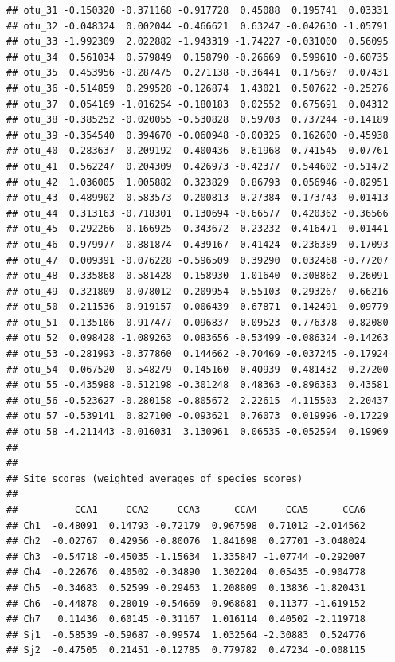 \documentclass[
]{book}
\begin{document}
\begin{verbatim}
## otu_31 -0.150320 -0.371168 -0.917728  0.45088  0.195741  0.03331
## otu_32 -0.048324  0.002044 -0.466621  0.63247 -0.042630 -1.05791
## otu_33 -1.992309  2.022882 -1.943319 -1.74227 -0.031000  0.56095
## otu_34  0.561034  0.579849  0.158790 -0.26669  0.599610 -0.60735
## otu_35  0.453956 -0.287475  0.271138 -0.36441  0.175697  0.07431
## otu_36 -0.514859  0.299528 -0.126874  1.43021  0.507622 -0.25276
## otu_37  0.054169 -1.016254 -0.180183  0.02552  0.675691  0.04312
## otu_38 -0.385252 -0.020055 -0.530828  0.59703  0.737244 -0.14189
## otu_39 -0.354540  0.394670 -0.060948 -0.00325  0.162600 -0.45938
## otu_40 -0.283637  0.209192 -0.400436  0.61968  0.741545 -0.07761
## otu_41  0.562247  0.204309  0.426973 -0.42377  0.544602 -0.51472
## otu_42  1.036005  1.005882  0.323829  0.86793  0.056946 -0.82951
## otu_43  0.489902  0.583573  0.200813  0.27384 -0.173743  0.01413
## otu_44  0.313163 -0.718301  0.130694 -0.66577  0.420362 -0.36566
## otu_45 -0.292266 -0.166925 -0.343672  0.23232 -0.416471  0.01441
## otu_46  0.979977  0.881874  0.439167 -0.41424  0.236389  0.17093
## otu_47  0.009391 -0.076228 -0.596509  0.39290  0.032468 -0.77207
## otu_48  0.335868 -0.581428  0.158930 -1.01640  0.308862 -0.26091
## otu_49 -0.321809 -0.078012 -0.209954  0.55103 -0.293267 -0.66216
## otu_50  0.211536 -0.919157 -0.006439 -0.67871  0.142491 -0.09779
## otu_51  0.135106 -0.917477  0.096837  0.09523 -0.776378  0.82080
## otu_52  0.098428 -1.089263  0.083656 -0.53499 -0.086324 -0.14263
## otu_53 -0.281993 -0.377860  0.144662 -0.70469 -0.037245 -0.17924
## otu_54 -0.067520 -0.548279 -0.145160  0.40939  0.481432  0.27200
## otu_55 -0.435988 -0.512198 -0.301248  0.48363 -0.896383  0.43581
## otu_56 -0.523627 -0.280158 -0.805672  2.22615  4.115503  2.20437
## otu_57 -0.539141  0.827100 -0.093621  0.76073  0.019996 -0.17229
## otu_58 -4.211443 -0.016031  3.130961  0.06535 -0.052594  0.19969
## 
## 
## Site scores (weighted averages of species scores)
## 
##          CCA1     CCA2     CCA3      CCA4     CCA5      CCA6
## Ch1  -0.48091  0.14793 -0.72179  0.967598  0.71012 -2.014562
## Ch2  -0.02767  0.42956 -0.80076  1.841698  0.27701 -3.048024
## Ch3  -0.54718 -0.45035 -1.15634  1.335847 -1.07744 -0.292007
## Ch4  -0.22676  0.40502 -0.34890  1.302204  0.05435 -0.904778
## Ch5  -0.34683  0.52599 -0.29463  1.208809  0.13836 -1.820431
## Ch6  -0.44878  0.28019 -0.54669  0.968681  0.11377 -1.619152
## Ch7   0.11436  0.60145 -0.31167  1.016114  0.40502 -2.119718
## Sj1  -0.58539 -0.59687 -0.99574  1.032564 -2.30883  0.524776
## Sj2  -0.47505  0.21451 -0.12785  0.779782  0.47234 -0.008115

\end{verbatim}
\end{document}
